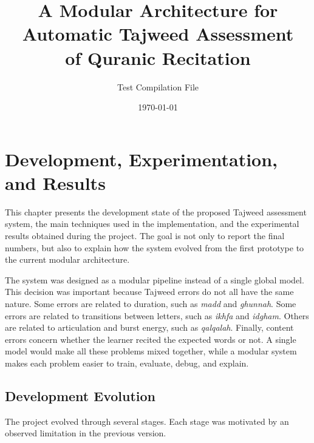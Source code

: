 \documentclass[12pt,a4paper]{report}
\title{\textbf{A Modular Architecture for Automatic Tajweed Assessment\\
               of Quranic Recitation}}
\author{Test Compilation File}
\date{\today}
\begin{document}
\maketitle
\tableofcontents
\chapter{Development, Experimentation, and Results}
\label{chap:development_experimentation}

This chapter presents the development state of the proposed Tajweed assessment
system, the main techniques used in the implementation, and the experimental
results obtained during the project. The goal is not only to report the final
numbers, but also to explain how the system evolved from the first prototype to
the current modular architecture.

The system was designed as a modular pipeline instead of a single global model.
This decision was important because Tajweed errors do not all have the same
nature. Some errors are related to duration, such as \textit{madd} and
\textit{ghunnah}. Some errors are related to transitions between letters, such
as \textit{ikhfa} and \textit{idgham}. Others are related to articulation and
burst energy, such as \textit{qalqalah}. Finally, content errors concern whether
the learner recited the expected words or not. A single model would make all
these problems mixed together, while a modular system makes each problem easier
to train, evaluate, debug, and explain.

\section{Development Evolution}

The project evolved through several stages. Each stage was motivated by an
observed limitation in the previous version.
\end{document}
